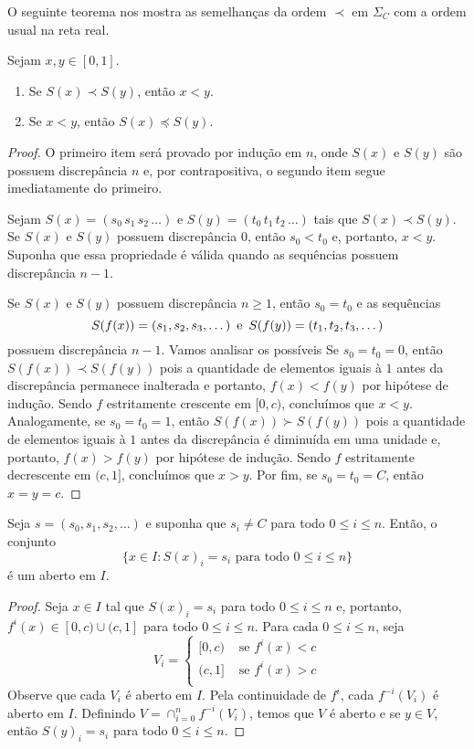 O seguinte teorema nos mostra as semelhanças da ordem $\prec$ em $\Sigma_C$ com a ordem usual na reta real.

\begin{theorem}
Sejam $x, y \in [0, 1]$.
\begin{enumerate}
\item Se $S(x) \prec S(y)$, então $x < y$.
\item Se $x < y$, então $S(x) \preceq S(y)$.
\end{enumerate}
\end{theorem}

\begin{proof}
O primeiro item será provado por indução em $n$, onde $S(x)$ e $S(y)$ são possuem discrepância $n$ e, por contrapositiva, o segundo item segue imediatamente do primeiro.

Sejam $S(x) = (s_0\, s_1\, s_2\, \dots)$ e $S(y) = (t_0\, t_1\, t_2\, \dots)$ tais que $S(x) \prec S(y)$. Se $S(x)$ e $S(y)$ possuem discrepância $0$, então $s_0 < t_0$ e, portanto, $x < y$. Suponha que essa propriedade é válida quando as sequências possuem discrepância $n-1$.

Se $S(x)$ e $S(y)$ possuem discrepância $n \geq 1$, então $s_0 = t_0$ e as sequências 
$$S(f(x)) = (s_1, s_2, s_3, \dots) \textrm{\, e \,} S(f(y)) = (t_1, t_2, t_3, \dots)$$
possuem discrepância $n-1$. Vamos analisar os possíveis Se $s_0 = t_0 = 0$, então $S(f(x)) \prec S(f(y))$ pois a quantidade de elementos iguais à $1$ antes da discrepância permanece inalterada e portanto, $f(x) < f(y)$ por hipótese de indução. Sendo $f$ estritamente crescente em $[0, c)$, concluímos que $x < y$. Analogamente, se $s_0 = t_0 = 1$, então $S(f(x)) \succ S(f(y))$ pois a quantidade de elementos iguais à $1$ antes da discrepância é diminuída em uma unidade e, portanto, $f(x) > f(y)$ por hipótese de indução. Sendo $f$ estritamente decrescente em $(c, 1]$, concluímos que $x > y$. Por fim, se $s_0 = t_0 = C$, então $x = y = c$.
\end{proof}

\begin{lemma}
Seja $s = (s_0, s_1, s_2, \dots)$ e suponha que $s_i \neq C$ para todo $0 \leq i \leq n$. Então, o conjunto
$$\{ x \in I : S(x)_i = s_i \textrm{ para todo } 0 \leq i \leq n \}$$
é um aberto em $I$.
\end{lemma}

\begin{proof}
Seja $x \in I$ tal que $S(x)_i = s_i$ para todo $0 \leq i \leq n$ e, portanto, $f^i(x) \in [0,c) \cup (c, 1]$ para todo $0 \leq i \leq n$. Para cada $0 \leq i \leq n$, seja
\[ V_i = 
\begin{cases} 
  [0, c) & \textrm{ se } f^i(x) < c \\
  (c, 1] & \textrm{ se } f^i(x) > c \\
\end{cases}
\]
Observe que cada $V_i$ é aberto em $I$. Pela continuidade de $f^i$, cada $f^{-i}(V_i)$ é aberto em $I$. Definindo $V = \cap_{i=0}^n f^{-i}(V_i)$, temos que $V$ é aberto e se $y \in V$, então $S(y)_i = s_i$ para todo $0 \leq i \leq n$.  
\end{proof}

